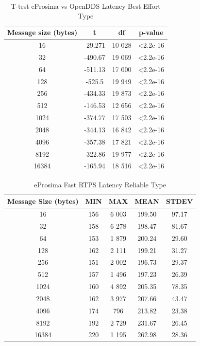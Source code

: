 \documentclass{csfourzero}
\begin{document}
\begin{table}[!h]
	\centering
	\caption{T-test eProsima vs OpenDDS Latency Best Effort Type}
	\label{T-test-latency-table}
	\begin{tabular}{|c|c|c|c|}
		\hline 
		 Message size (bytes) & t & df & p-value \\ 
		\hline 
		16 & -29.271 & 10 028 & \textless 2.2e-16 \\ 
		\hline 
		32 & -490.67 & 19 069 & \textless 2.2e-16 \\ 
		\hline 
		64 & -511.13 & 17 000 & \textless 2.2e-16 \\ 
		\hline 
		128 & -525.5 & 19 949 & \textless 2.2e-16 \\ 
		\hline 
		256 & -434.33 & 19 873 & \textless 2.2e-16 \\ 
		\hline 
		512 & -146.53 & 12 656 & \textless 2.2e-16 \\ 
		\hline 
		1024 & -374.77 & 17 503 & \textless 2.2e-16 \\ 
		\hline 
		2048 & -344.13 & 16 842 & \textless 2.2e-16 \\ 
		\hline 
		4096 & -357.38 & 17 821 & \textless 2.2e-16 \\ 
		\hline 
		8192 & -322.86 & 19 977 & \textless 2.2e-16 \\ 
		\hline 
		16384 & -165.94 & 18 516 & \textless 2.2e-16 \\ 
		\hline 
	\end{tabular} 
\end{table}


\begin{table}[!h]
	\centering
	\caption{eProsima Fast RTPS Latency Reliable Type}
	\label{eProima-latency-table}
	\begin{tabular}{|c|c|c|c|c|}
		\hline 
		Message Size (bytes)& MIN & MAX & MEAN & STDEV \\ 
		\hline 
		16 & 156 & 6 003 & 199.50 & 97.17 \\ 
		\hline 
		32 & 158 & 6 278 & 198.47 & 81.67 \\ 
		\hline 
		64 & 153 & 1 879 & 200.24 & 29.60 \\ 
		\hline 
		128 & 162 & 2 111 & 199.21 & 31.27 \\ 
		\hline 
		256 & 151 & 2 002 & 196.73 & 29.37 \\ 
		\hline 
		512 & 157 & 1 496 & 197.23 & 26.39 \\ 
		\hline 
		1024 & 160 & 4 892 & 205.35 & 78.35 \\ 
		\hline 
		2048 & 162 & 3 977 & 207.66 & 43.47 \\ 
		\hline 
		4096 & 174 & 796 & 213.82 & 23.38 \\ 
		\hline 
		8192 & 192 & 2 729 & 231.67 & 26.45 \\ 
		\hline 
		16384 & 220 & 1 195 & 262.98 & 28.36 \\ 
		\hline 
	\end{tabular}
\end{table}
\end{document}
